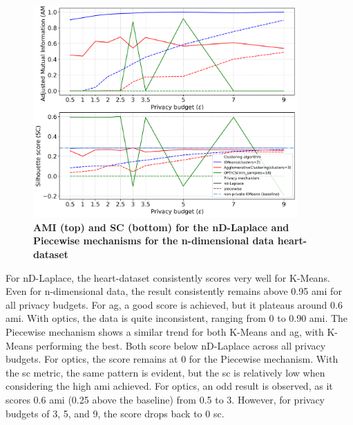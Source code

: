 \begin{figure}[H]
  \centering

  \caption{\textbf{AMI (top) and SC (bottom) for the nD-Laplace and Piecewise mechanisms for the n-dimensional data heart-dataset}}
  \includegraphics[width=0.9\textwidth]{Results/nd-laplace/nd-Laplace/heart-dataset/ami-and-sc_9_dimensions.png}

  \label{fig:validation-heart-dataset_comparison_nd-laplace}
\end{figure}
For nD-Laplace, the heart-dataset consistently scores very well for K-Means. Even for n-dimensional data, the result consistently remains above 0.95 \gls{ami} for all privacy budgets.
For \gls{ag}, a good score is achieved, but it plateaus around 0.6 \gls{ami}.
With \gls{optics}, the data is quite inconsistent, ranging from 0 to 0.90 \gls{ami}.
The Piecewise mechanism shows a similar trend for both K-Means and \gls{ag}, with K-Means performing the best. Both score below nD-Laplace across all privacy budgets.
For \gls{optics}, the score remains at 0 for the Piecewise mechanism.
With the \gls{sc} metric, the same pattern is evident, but the \gls{sc} is relatively low when considering the high \gls{ami} achieved. For \gls{optics}, an odd result is observed, as it scores 0.6 \gls{ami} (0.25 above the baseline) from 0.5 to 3. However, for privacy budgets of 3, 5, and 9, the score drops back to 0 \gls{sc}.


